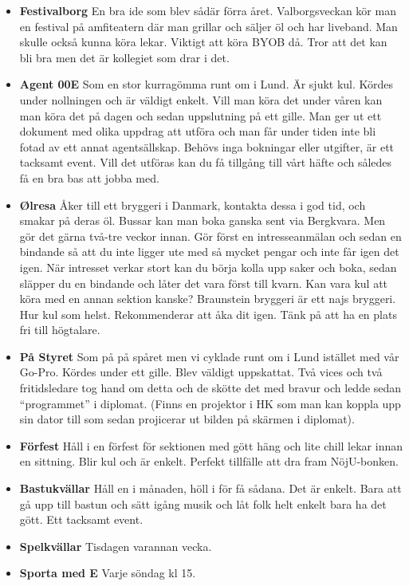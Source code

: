 \documentclass[10pt]{article}
\begin{document}
\begin{itemize}
        \item \textbf{Festivalborg} \newline En bra ide som blev sådär förra året. Valborgsveckan kör man en festival på amfiteatern där man grillar och säljer öl och har liveband. Man skulle också kunna köra lekar. Viktigt att köra BYOB då. Tror att det kan bli bra men det är kollegiet som drar i det.
        \item \textbf{Agent 00E} \newline Som en stor kurragömma runt om i Lund. Är sjukt kul. Kördes under nollningen och är väldigt enkelt. Vill man köra det under våren kan man köra det på dagen och sedan uppslutning på ett gille. Man ger ut ett dokument med olika uppdrag att utföra och man får under tiden inte bli fotad av ett annat agentsällskap. Behövs inga bokningar eller utgifter, är ett tacksamt event. Vill det utföras kan du få tillgång till vårt häfte och således få en bra bas att jobba med.
        \item \textbf{Ølresa} \newline Åker till ett bryggeri i Danmark, kontakta dessa i god tid, och smakar på deras öl. Bussar kan man boka ganska sent via Bergkvara. Men gör det gärna två-tre veckor innan. Gör först en intresseanmälan och sedan en bindande så att du inte ligger ute med så mycket pengar och inte får igen det igen. När intresset verkar stort kan du börja kolla upp saker och boka, sedan släpper du en bindande och låter det vara först till kvarn. Kan vara kul att köra med en annan sektion kanske? Braunstein bryggeri är ett najs bryggeri. Hur kul som helst. Rekommenderar att åka dit igen. Tänk på att ha en plats fri till högtalare.
        \item \textbf{På Styret} \newline Som på på spåret men vi cyklade runt om i Lund istället med vår Go-Pro. Kördes under ett gille. Blev väldigt uppskattat. Två vices och två fritidsledare tog hand om detta och de skötte det med bravur och ledde sedan “programmet” i diplomat. (Finns en projektor i HK som man kan koppla upp sin dator till som sedan projicerar ut bilden på skärmen i diplomat).
        \item \textbf{Förfest} \newline Håll i en förfest för sektionen med gött häng och lite chill lekar innan en sittning. Blir kul och är enkelt. Perfekt tillfälle att dra fram NöjU-bonken.
        \item \textbf{Bastukvällar} \newline Håll en i månaden, höll i för få sådana. Det är enkelt. Bara att gå upp till bastun och sätt igång musik och låt folk helt enkelt bara ha det gött. Ett tacksamt event.
        \item \textbf{Spelkvällar} \newline Tisdagen varannan vecka.
        \item \textbf{Sporta med E} \newline Varje söndag kl 15.
    \end{itemize}
\end{document}
